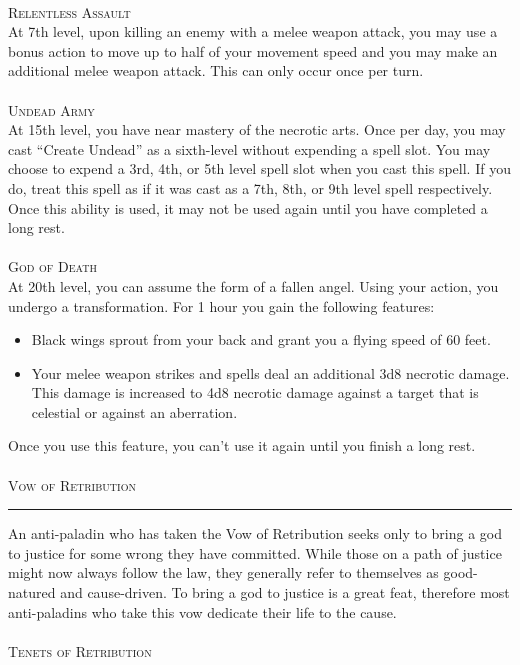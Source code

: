 \documentclass[22pt,a4paper]{article}
\newcommand{\HRule}[2]{\par
  \vspace*{\dimexpr-\parskip-\baselineskip+#2}
  \begingroup
  	\color{sepcol}
  	\noindent\rule{\linewidth}{#1}\par
  \endgroup  
  \vspace*{\dimexpr-\parskip-.5\baselineskip+#2}}
\begin{document}
\begin{multicols*}{2}
\\
{\fontsize{12pt}{12pt}\textcolor{title}{\textsc{Relentless Assault}}}\\
At 7th level, upon killing an enemy with a melee weapon attack, you may use a bonus action to move up to half of your movement speed and you may make an additional melee weapon attack. This can only occur once per turn. \\
\\
{\fontsize{12pt}{12pt}\textcolor{title}{\textsc{Undead Army}}}\\
At 15th level, you have near mastery of the necrotic arts. Once per day, you may cast “Create Undead” as a sixth-level without expending a spell slot. You may choose to expend a 3rd, 4th, or 5th level spell slot when you cast this spell. If you do, treat this spell as if it was cast as a 7th, 8th, or 9th level spell respectively. Once this ability is used, it may not be used again until you have completed a long rest. \\
\\
{\fontsize{12pt}{12pt}\textcolor{title}{\textsc{God of Death}}}\\
At 20th level, you can assume the form of a fallen angel. Using your action, you undergo a transformation. For 1 hour you gain the following features: \\
\begin{itemize}
\setlength\itemsep{-6pt}
\item Black wings sprout from your back and grant you a flying speed of 60 feet.
\item Your melee weapon strikes and spells deal an additional 3d8 necrotic damage. This damage is increased to 4d8 necrotic damage against a target that is celestial or against an aberration.
\end{itemize}
Once you use this feature, you can't use it again until you finish a long rest.\\
\\
{\fontsize{14pt}{14pt}\textcolor{title}{\textsc{Vow of Retribution}}}
\HRule{1pt}{8pt}
An anti-paladin who has taken the Vow of Retribution seeks only to bring a god to justice for some wrong they have committed. While those on a path of justice might now always follow the law, they generally refer to themselves as good-natured and cause-driven. To bring a god to justice is a great feat, therefore most anti-paladins who take this vow dedicate their life to the cause.\\
\\
{\fontsize{12pt}{12pt}\textcolor{title}{\textsc{Tenets of Retribution}}}\\

\end{multicols*}
\end{document}
